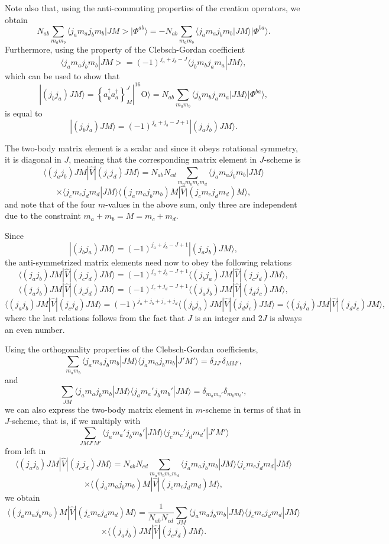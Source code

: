 \documentclass[graybox,sectrefs,envcountresetchap,open=right]{svmonodo}
\begin{document}
Note also that, using the anti-commuting 
properties of the creation operators, we obtain
\[
N_{ab}\sum_{m_am_b}\langle j_am_aj_bm_b|JM>|\Phi^{ab}\rangle=-N_{ab}\sum_{m_am_b}\langle j_am_aj_bm_b|JM\rangle|\Phi^{ba}\rangle.
\]
Furthermore, using the property of the Clebsch-Gordan coefficient
\[
\langle j_am_aj_bm_b|JM>=(-1)^{j_a+j_b-J}\langle j_bm_bj_am_a|JM\rangle,
\]
which can be used to show that
\[
|(j_bj_a)JM\rangle  = \left\{a^{\dagger}_ba^{\dagger}_a\right\}^J_M|^{16}\mathrm{O}\rangle=N_{ab}\sum_{m_am_b}\langle j_bm_bj_am_a|JM\rangle|\Phi^{ba}\rangle, 
\]
is equal to 
\[
|(j_bj_a)JM\rangle=(-1)^{j_a+j_b-J+1}|(j_aj_b)JM\rangle.
\]




The two-body matrix element is a scalar and since it obeys rotational symmetry, it is diagonal in $J$, 
meaning that the corresponding matrix element in $J$-scheme is 
\[
\langle (j_aj_b) JM | \hat{V} | (j_cj_d) JM \rangle = N_{ab}N_{cd}\sum_{m_am_bm_cm_d}\langle j_am_aj_bm_b|JM\rangle
\]
\[
\times \langle j_cm_cj_dm_d|JM\rangle\langle (j_am_aj_bm_b)M |  \hat{V} | (j_cm_cj_dm_d)M \rangle,
\]
and note that of the four $m$-values in the above sum, only three are independent due to the constraint $m_a+m_b=M=m_c+m_d$.

Since
\[
|(j_bj_a)JM\rangle=(-1)^{j_a+j_b-J+1}|(j_aj_b)JM\rangle,
\]
the anti-symmetrized matrix elements need now to obey the following relations
\[
\langle (j_aj_b) JM | \hat{V} | (j_cj_d) JM \rangle = (-1)^{j_a+j_b-J+1}\langle (j_bj_a) JM | \hat{V} | (j_cj_d) JM \rangle,
\]
\[
\langle (j_aj_b) JM | \hat{V} | (j_cj_d) JM \rangle = (-1)^{j_c+j_d-J+1}\langle (j_aj_b) JM | \hat{V} | (j_dj_c) JM \rangle,
\]
\[
\langle (j_aj_b) JM | \hat{V} | (j_cj_d) JM \rangle = (-1)^{j_a+j_b+j_c+j_d}\langle (j_bj_a) JM | \hat{V} | (j_dj_c) JM \rangle=\langle (j_bj_a) JM | \hat{V} | (j_dj_c) JM \rangle,
\]
where the last relations follows from the fact that $J$ is an integer and $2J$ is always an even number.


Using the orthogonality properties of the Clebsch-Gordan coefficients,
\[
\sum_{m_am_b}\langle j_am_aj_bm_b|JM\rangle\langle j_am_aj_bm_b|J'M'\rangle=\delta_{JJ'}\delta_{MM'},
\]
and
\[
\sum_{JM}\langle j_am_aj_bm_b|JM\rangle\langle j_am_a'j_bm_b'|JM\rangle=\delta_{m_am_a'}\delta_{m_bm_b'},
\]
we can also express the two-body matrix element in $m$-scheme in terms of that in $J$-scheme, that is, if we multiply with 
\[
\sum_{JMJ'M'}\langle j_am_a'j_bm_b'|JM\rangle\langle j_cm_c'j_dm_d'|J'M'\rangle
\]
from left in
\[
\langle (j_aj_b) JM | \hat{V} | (j_cj_d) JM \rangle = N_{ab}N_{cd}\sum_{m_am_bm_cm_d}\langle j_am_aj_bm_b|JM\rangle\langle j_cm_cj_dm_d|JM\rangle
\]
\[
\times \langle (j_am_aj_bm_b)M|  \hat{V} | (j_cm_cj_dm_d)M\rangle,
\]
we obtain
\[
\langle (j_am_aj_bm_b)M |  \hat{V} | (j_cm_cj_dm_d)M\rangle=\frac{1}{N_{ab}N_{cd}}\sum_{JM}\langle j_am_aj_bm_b|JM\rangle\langle j_cm_cj_dm_d|JM\rangle
\]
\[
\times \langle (j_aj_b) JM | \hat{V} | (j_cj_d) JM \rangle.
\]
\end{document}

